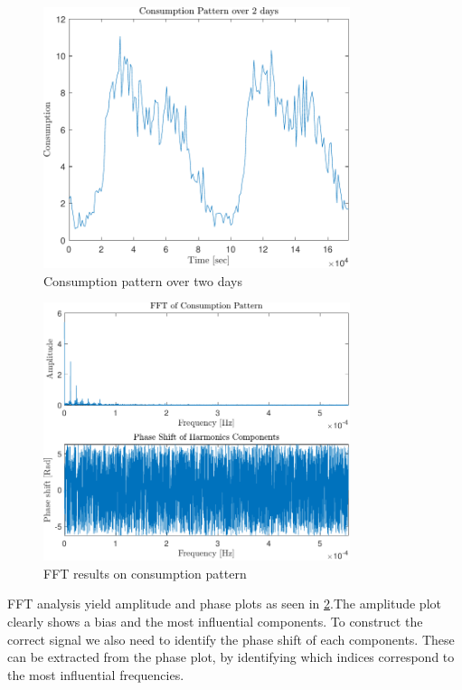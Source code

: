 \begin{figure}[h!]
	\centering
	\includegraphics[width=0.8\textwidth]{Pictures/ConsumptionPattern.pdf}
	
	\caption{Consumption pattern over two days}
	\label{fig:Consumptionpattern}
\end{figure}

\begin{figure}[h!]
	\centering
	\includegraphics[width=0.8\textwidth]{Pictures/FFT.pdf}
	
	\caption{FFT results on consumption pattern}
	\label{fig:FFT}
\end{figure}

FFT analysis yield amplitude and phase plots as seen in \cref{fig:FFT}.The amplitude plot clearly shows a bias and the most influential components. To construct the correct signal we also need to identify the phase shift of each components. These can be extracted from the phase plot, by identifying which indices correspond to the most influential frequencies.

